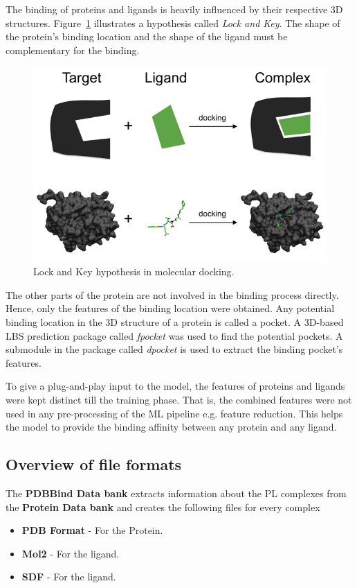 \documentclass[11pt]{article}
\begin{document}
The binding of proteins and ligands is heavily influenced by their respective 3D structures.
Figure~\ref{fig:lockandkey} illustrates a hypothesis called \textit{Lock and Key}.
The shape of the protein's binding location and the shape of the ligand must be complementary for the binding.

\begin{figure}[htb]
  \centering
    \includegraphics[scale=0.7]{images/lock_and_key}
    \caption{Lock and Key hypothesis in molecular docking.  \cite{lockandkeyformatpng}}
    \label{fig:lockandkey}
\end{figure}

The other parts of the protein are not involved in the binding process directly.
Hence,  only the features of the binding location were obtained.
Any potential binding location in the 3D structure of a protein is called a pocket.
A 3D-based LBS prediction package called \textit{fpocket} was used to find the potential pockets.
A submodule in the package called \textit{dpocket} is used to extract the binding pocket's features.

To give a plug-and-play input to the model,  the features of proteins and ligands were kept distinct till the training phase.
That is,  the combined features were not used in any pre-processing of the ML pipeline e.g. feature reduction.
This helps the model to provide the binding affinity between any protein and any ligand.



\subsection{Overview of file formats}
The \textbf{PDBBind Data bank} extracts information about the PL complexes from the \textbf{Protein Data bank} and creates the following files for every complex
\begin{itemize}
\item \textbf{PDB Format} - For the Protein.
\item  \textbf{Mol2} - For the ligand.
\item \textbf{SDF} - For the ligand.
\end{itemize}
\end{document}
